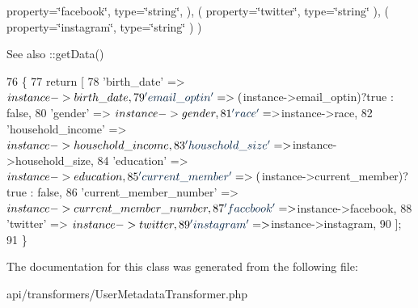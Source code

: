 property=\char`\"{}facebook\char`\"{}, type=\char`\"{}string\char`\"{}, ), ( property=\char`\"{}twitter\char`\"{}, type=\char`\"{}string\char`\"{} ), ( property=\char`\"{}instagram\char`\"{}, type=\char`\"{}string\char`\"{} ) )  \begin{DoxySeeAlso}{See also}
\+::get\+Data() 
\end{DoxySeeAlso}

\begin{DoxyCode}
76     \{
77         \textcolor{keywordflow}{return} [
78             \textcolor{stringliteral}{'birth\_date'}            => $instance->birth\_date,      
79             \textcolor{stringliteral}{'email\_optin'}           => ($instance->email\_optin)?\textcolor{keyword}{true} : \textcolor{keyword}{false},    
80             \textcolor{stringliteral}{'gender'}                => $instance->gender,
81             \textcolor{stringliteral}{'race'}                  => $instance->race,
82             \textcolor{stringliteral}{'household\_income'}      => $instance->household\_income,
83             \textcolor{stringliteral}{'household\_size'}        => $instance->household\_size,
84             \textcolor{stringliteral}{'education'}             => $instance->education,    
85             \textcolor{stringliteral}{'current\_member'}        => ($instance->current\_member)?\textcolor{keyword}{true} : \textcolor{keyword}{false},
86             \textcolor{stringliteral}{'current\_member\_number'} => $instance->current\_member\_number,
87             \textcolor{stringliteral}{'facebook'}              => $instance->facebook,
88             \textcolor{stringliteral}{'twitter'}               => $instance->twitter,
89             \textcolor{stringliteral}{'instagram'}             => $instance->instagram,
90         ];
91     \}    
\end{DoxyCode}


The documentation for this class was generated from the following file\+:\begin{DoxyCompactItemize}
\item 
api/transformers/User\+Metadata\+Transformer.\+php\end{DoxyCompactItemize}
